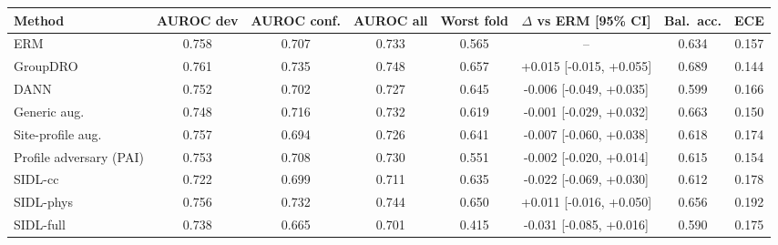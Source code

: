 \begin{tabular}{lccccccc}
\toprule
Method & AUROC dev & AUROC conf. & AUROC all & Worst fold & $\Delta$ vs ERM [95\% CI] & Bal.\ acc. & ECE \\
\midrule
ERM & 0.758 & 0.707 & 0.733 & 0.565 & -- & 0.634 & 0.157 \\
GroupDRO & 0.761 & 0.735 & 0.748 & 0.657 & +0.015 [-0.015, +0.055] & 0.689 & 0.144 \\
DANN & 0.752 & 0.702 & 0.727 & 0.645 & -0.006 [-0.049, +0.035] & 0.599 & 0.166 \\
Generic aug. & 0.748 & 0.716 & 0.732 & 0.619 & -0.001 [-0.029, +0.032] & 0.663 & 0.150 \\
Site-profile aug. & 0.757 & 0.694 & 0.726 & 0.641 & -0.007 [-0.060, +0.038] & 0.618 & 0.174 \\
Profile adversary (PAI) & 0.753 & 0.708 & 0.730 & 0.551 & -0.002 [-0.020, +0.014] & 0.615 & 0.154 \\
SIDL-cc & 0.722 & 0.699 & 0.711 & 0.635 & -0.022 [-0.069, +0.030] & 0.612 & 0.178 \\
SIDL-phys & 0.756 & 0.732 & 0.744 & 0.650 & +0.011 [-0.016, +0.050] & 0.656 & 0.192 \\
SIDL-full & 0.738 & 0.665 & 0.701 & 0.415 & -0.031 [-0.085, +0.016] & 0.590 & 0.175 \\
\bottomrule
\end{tabular}